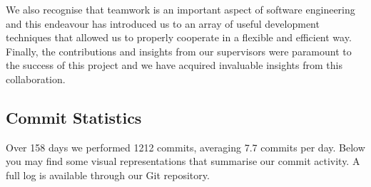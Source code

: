 \documentclass[a4paper,11pt]{article}
\begin{document}
We also recognise that teamwork is an important aspect of software engineering and this endeavour has
introduced us to an array of useful development techniques that allowed us to properly cooperate in a flexible
and efficient way. Finally, the contributions and insights from our supervisors were paramount to the success of
this project and we have acquired invaluable insights from this collaboration.


\clearpage
{}

\clearpage

\begin{appendices}
\appendix
\section{Commit Statistics}

Over 158 days we performed 1212 commits, averaging 7.7 commits per day. Below you may find some visual representations that summarise our commit activity. A full log is available through our Git repository.


\end{appendices}
\end{document}
